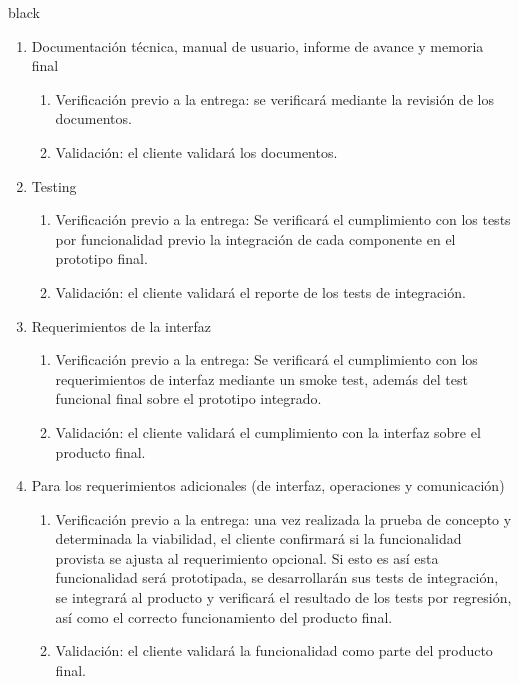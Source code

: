 \documentclass[
11pt, %
]{charter}
\begin{document}
\begin{consigna}{black}
\begin{enumerate}
		\item Documentación técnica, manual de usuario, informe de avance y memoria final
		\begin{enumerate}				
			\item Verificación previo a la entrega: se verificará mediante la revisión de los documentos.			
			\item Validación: el cliente validará los documentos.			
		\end{enumerate}			
		
		\item Testing
		\begin{enumerate}				
			\item Verificación previo a la entrega: Se verificará el cumplimiento con los tests por funcionalidad previo la integración de cada componente en el prototipo final. 
			\item Validación: el cliente validará el reporte de los tests de integración.
		\end{enumerate}			
		
		\item Requerimientos de la interfaz		
		\begin{enumerate}			
			\item Verificación previo a la entrega: Se verificará el cumplimiento con los requerimientos de interfaz mediante un smoke test, además del test funcional final sobre el prototipo integrado.			
			\item Validación: el cliente validará el cumplimiento con la interfaz sobre el producto final.		
		\end{enumerate}	
		
		\item Para los requerimientos adicionales (de interfaz, operaciones y comunicación)
		\begin{enumerate}			
			\item Verificación previo a la entrega: una vez realizada la prueba de concepto y determinada la viabilidad, el cliente confirmará si la funcionalidad provista se ajusta al requerimiento opcional. Si esto es así esta funcionalidad será prototipada, se desarrollarán sus tests de integración, se integrará al producto y verificará el resultado de los tests por regresión, así como el correcto funcionamiento del producto final.
			\item Validación: el cliente validará la funcionalidad como parte del producto final.
	\end{enumerate}
\end{enumerate}


\end{consigna}
\end{document}
